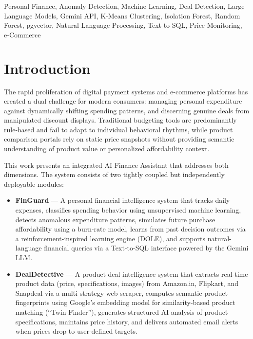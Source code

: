 \documentclass[]{IEEEtran}
\begin{document}
\begin{IEEEkeywords}
Personal Finance, Anomaly Detection, Machine Learning, Deal Detection, Large Language Models, Gemini API, K-Means Clustering, Isolation Forest, Random Forest, pgvector, Natural Language Processing, Text-to-SQL, Price Monitoring, e-Commerce
\end{IEEEkeywords}

\section{Introduction}
\label{sec:intro}

The rapid proliferation of digital payment systems and e-commerce platforms has created a dual challenge for modern consumers: managing personal expenditure against dynamically shifting spending patterns, and discerning genuine deals from manipulated discount displays. Traditional budgeting tools are predominantly rule-based and fail to adapt to individual behavioral rhythms, while product comparison portals rely on static price snapshots without providing semantic understanding of product value or personalized affordability context.

This work presents an integrated AI Finance Assistant that addresses both dimensions. The system consists of two tightly coupled but independently deployable modules:

\begin{itemize}
    \item \textbf{FinGuard} --- A personal financial intelligence system that tracks daily expenses, classifies spending behavior using unsupervised machine learning, detects anomalous expenditure patterns, simulates future purchase affordability using a burn-rate model, learns from past decision outcomes via a reinforcement-inspired learning engine (DOLE), and supports natural-language financial queries via a Text-to-SQL interface powered by the Gemini LLM.
    
    \item \textbf{DealDetective} --- A product deal intelligence system that extracts real-time product data (price, specifications, images) from Amazon.in, Flipkart, and Snapdeal via a multi-strategy web scraper, computes semantic product fingerprints using Google's embedding model for similarity-based product matching (``Twin Finder''), generates structured AI analysis of product specifications, maintains price history, and delivers automated email alerts when prices drop to user-defined targets.
\end{itemize}
\end{document}
